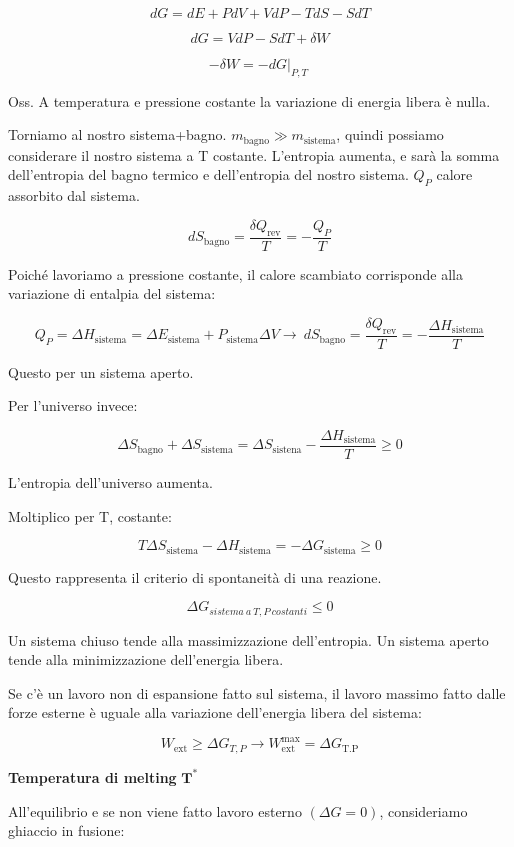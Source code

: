 \[dG = dE + PdV + VdP - TdS - SdT\]

\[dG = VdP - SdT + \delta W\]

\[- \delta W = - d{G|}_{P,T}\ \]

Oss. A temperatura e pressione costante la variazione di energia libera
è nulla.

Torniamo al nostro sistema+bagno.
\(m_{\text{bagno}} \gg m_{\text{sistema}}\), quindi possiamo considerare
il nostro sistema a T costante. L'entropia aumenta, e sarà la somma
dell'entropia del bagno termico e dell'entropia del nostro sistema.
\(Q_{P}\) calore assorbito dal sistema.

\[dS_{\text{bagno}} = \frac{\delta Q_{\text{rev}}}{T} = - \frac{Q_{P}}{T}\]

Poiché lavoriamo a pressione costante, il calore scambiato corrisponde
alla variazione di entalpia del sistema:

\[Q_{P} = \Delta H_{\text{sistema}} = \Delta E_{\text{sistema}} + P_{\text{sistema}}\Delta V \rightarrow \ dS_{\text{bagno}} = \frac{\delta Q_{\text{rev}}}{T} = - \frac{\Delta H_{\text{sistema}}}{T}\]

Questo per un sistema aperto.

Per l'universo invece:

\[\Delta S_{\text{bagno}} + \Delta S_{\text{sistema}} = \Delta S_{\text{sistena}} - \frac{\Delta H_{\text{sistema}}}{T} \geq 0\]

L'entropia dell'universo aumenta.

Moltiplico per T, costante:

\[T\Delta S_{\text{sistema}} - \Delta H_{\text{sistema}} = - \Delta G_{\text{sistema}} \geq 0\]

Questo rappresenta il criterio di spontaneità di una reazione.

\[\Delta G_{sistema\ a\ T,P\ costanti} \leq 0\]

Un sistema chiuso tende alla massimizzazione dell'entropia. Un sistema
aperto tende alla minimizzazione dell'energia libera.

Se c'è un lavoro non di espansione fatto sul sistema, il lavoro massimo
fatto dalle forze esterne è uguale alla variazione dell'energia libera
del sistema:

\[W_{\text{ext}} \geq \Delta G_{T,P} \rightarrow W_{\text{ext}}^{\max} = \Delta G_{\text{T.P}}\]

\textbf{Temperatura di melting} \(\mathbf{T}^{\mathbf{*}}\)

All'equilibrio e se non viene fatto lavoro esterno \((\Delta G = 0)\),
consideriamo ghiaccio in fusione:

